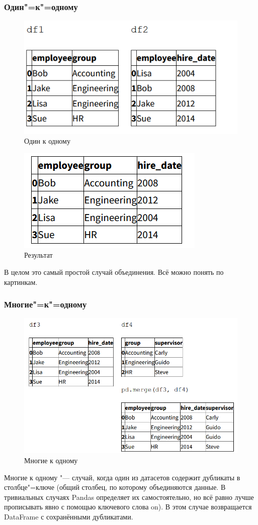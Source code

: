 \documentclass{article}
\begin{document}
\subsubsection*{Один"=к"=одному}
\begin{figure}[H]
    \centering
    \includegraphics[width=0.45\linewidth]{merge_onebyone.png}
    \caption{Один к одному}
    \label{fig:enter-label}
\end{figure}
\begin{figure}[H]
    \centering
    \includegraphics[width=0.45\linewidth]{merge_onebyone_result.png}
    \caption{Результат}
    \label{fig:enter-label}
\end{figure}
В целом это самый простой случай объединения. Всё можно понять по картинкам.

\subsubsection*{Многие"=к"=одному}
\begin{figure}[H]
    \centering
    \includegraphics[width=0.6\linewidth]{merge_manybyone.png}
    \caption{Многие к одному}
    \label{fig:enter-label}
\end{figure}
Многие к одному "--- случай, когда один из датасетов содержит дубликаты в столбце"=ключе (общий столбец, по которому объединяются данные. В тривиальных случаях Pandas определяет их самостоятельно, но всё равно лучше прописывать явно с помощью ключевого слова on). В этом случае возвращается DataFrame с сохранёнными дубликатами.
\end{document}
